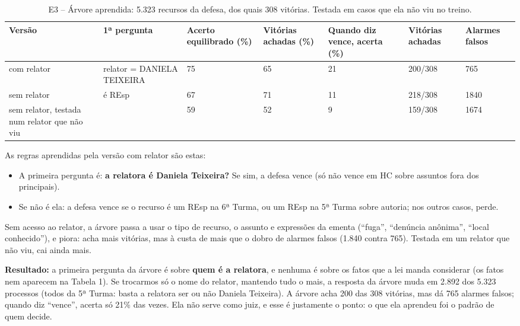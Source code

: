 \begin{table}[h]
\centering\small
\caption{E3 -- Árvore aprendida: 5.323 recursos da defesa, dos quais 308 vitórias. Testada em casos que ela não viu no treino.}
\label{tab:e3}
\begin{adjustbox}{max width=\textwidth}
\begin{tabular}{p{3.4cm}lp{1.6cm}p{1.6cm}p{1.9cm}p{1.4cm}p{1.3cm}}
\toprule
Versão & 1ª pergunta & Acerto equilibrado (\%) & Vitórias achadas (\%) & Quando diz vence, acerta (\%) & Vitórias achadas & Alarmes falsos \\
\midrule
com relator & relator = DANIELA TEIXEIRA & 75 & 65 & 21 & 200/308 & 765 \\
sem relator & é REsp & 67 & 71 & 11 & 218/308 & 1840 \\
sem relator, testada num relator que não viu &  & 59 & 52 & 9 & 159/308 & 1674 \\
\bottomrule
\end{tabular}
\end{adjustbox}
\end{table}

As regras aprendidas pela versão com relator são estas:
\begin{itemize}
  \item A primeira pergunta é: \textbf{a relatora é Daniela Teixeira?} Se sim, a defesa vence
        (só não vence em HC sobre assuntos fora dos principais).
  \item Se não é ela: a defesa vence se o recurso é um REsp na 6ª Turma, ou um REsp na 5ª Turma
        sobre autoria; nos outros casos, perde.
\end{itemize}
Sem acesso ao relator, a árvore passa a usar o tipo de recurso, o assunto e expressões da ementa
(``fuga'', ``denúncia anônima'', ``local conhecido''), e piora: acha mais vitórias, mas à custa
de mais que o dobro de alarmes falsos (1.840 contra 765). Testada em um relator que não viu, cai
ainda mais.

\textbf{Resultado:} a primeira pergunta da árvore é sobre \textbf{quem é a relatora}, e
nenhuma é sobre os fatos que a lei manda considerar (os fatos nem aparecem na Tabela 1). Se
trocarmos só o nome do relator, mantendo tudo o mais, a resposta da árvore muda em 2.892 dos
5.323 processos (todos da 5ª Turma: basta a relatora ser ou não Daniela Teixeira). A árvore
acha 200 das 308 vitórias, mas dá 765 alarmes falsos; quando diz ``vence'', acerta só 21\% das
vezes. Ela não serve como juiz, e esse é justamente o ponto: o que ela aprendeu foi o padrão de
quem decide.

